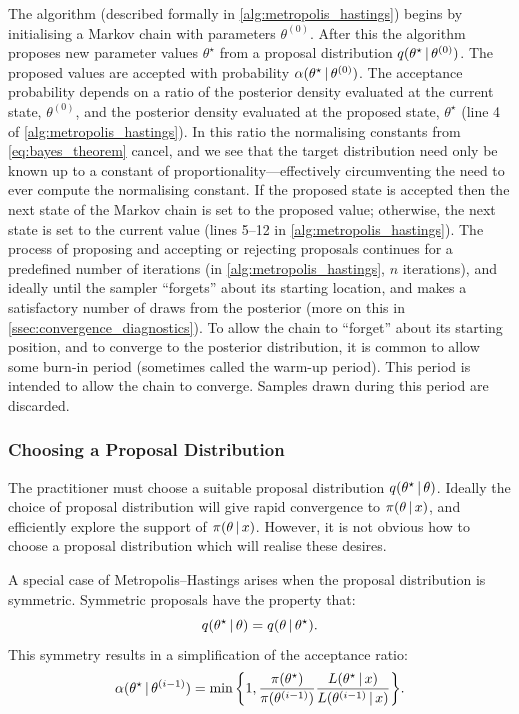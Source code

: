 The algorithm (described formally in \cref{alg:metropolis_hastings}) begins by
initialising a Markov chain with parameters $\theta^{(0)}$. After this the
algorithm proposes new parameter values $\theta^\star$ from a proposal
distribution $q(\theta^\star \,|\, \theta^{(0)})$. The proposed values are
accepted with probability $\alpha(\theta^\star \,|\, \theta^{(0)})$. The
acceptance probability depends on a ratio of the posterior density evaluated at
the current state, $\theta^{(0)}$, and the posterior density evaluated at the
proposed state, $\theta^\star$ (line 4 of \cref{alg:metropolis_hastings}). In
this ratio the normalising constants from \cref{eq:bayes_theorem} cancel, and
we see that the target distribution need only be known up to a constant of
proportionality---effectively circumventing the need to ever compute the
normalising constant. If the proposed state is accepted then the next state of
the Markov chain is set to the proposed value; otherwise, the next state is set
to the current value (lines 5--12 in \cref{alg:metropolis_hastings}). The
process of proposing and accepting or rejecting proposals continues for a
predefined number of iterations (in \cref{alg:metropolis_hastings}, $n$
iterations), and ideally until the sampler ``forgets'' about its starting
location, and makes a satisfactory number of draws from the posterior (more on
this in \cref{ssec:convergence_diagnostics}). To allow the chain to ``forget''
about its starting position, and to converge to the posterior distribution, it
is common to allow some burn-in period (sometimes called the warm-up period).
This period is intended to allow the chain to converge. Samples drawn during
this period are discarded.

\subsubsection{Choosing a Proposal Distribution}
\label{ssec:proposal_distribution}

The practitioner must choose a suitable proposal distribution $q(\theta^\star
\,|\, \theta)$. Ideally the choice of proposal distribution will give rapid
convergence to $\pi(\theta \,|\, x)$, and efficiently explore the support of
$\pi(\theta \,|\, x)$. However, it is not obvious how to choose a proposal
distribution which will realise these desires.

A special case of Metropolis--Hastings arises when the proposal distribution is
symmetric. Symmetric proposals have the property that:
\begin{equation*}
  q(\theta^\star \,|\, \theta) = q(\theta \,|\, \theta^\star).
\end{equation*}
This symmetry results in a simplification of the acceptance ratio:
\begin{equation*}
  \alpha({\theta}^\star \given \theta^{(i-1)})
    = \text{min}\,\bigg\{1,
                        \frac{\pi(\theta^\star)}{\pi(\theta^{(i-1)})}%
                        \frac{L(\theta^\star \given x)}%
                        {L(\theta^{(i-1)} \given x)}
                  \bigg\}.
\end{equation*}

